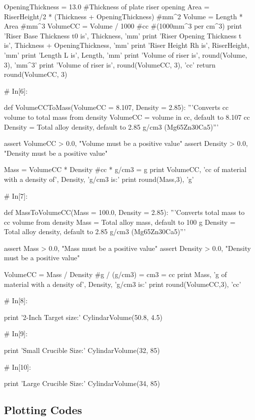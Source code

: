\documentclass[a4paper,8pt]{article}
\begin{document}
\begin{python}
OpeningThickness = 13.0 #Thickness of plate riser opening
Area = RiserHeight/2 * (Thickness + OpeningThickness) #mm^2
Volume = Length * Area #mm^3
VolumeCC = Volume / 1000 #cc #(1000mm^3 per cm^3)
print 'Riser Base Thickness t0 is', Thickness, 'mm'
print 'Riser Opening Thickness t is', Thickness + OpeningThickness, 'mm'
print 'Riser Height Rh is', RiserHeight, 'mm'
print 'Length L is', Length, 'mm'
print 'Volume of riser is', round(Volume, 3), 'mm^3'
print 'Volume of riser is', round(VolumeCC, 3), 'cc'
return round(VolumeCC, 3)


# In[6]:

def VolumeCCToMass(VolumeCC = 8.107, Density = 2.85):
'''Converts cc volume to total mass from density 
VolumeCC = volume in cc, default to 8.107 cc
Density = Total alloy density, default to 2.85 g/cm3 (Mg65Zn30Ca5)'''

assert VolumeCC > 0.0, "Volume must be a positive value"
assert Density > 0.0, "Density must be a positive value"

Mass = VolumeCC * Density #cc * g/cm3 = g
print VolumeCC, 'cc of material with a density of', Density, 'g/cm3 is:'
print round(Mass,3), 'g'


# In[7]:

def MassToVolumeCC(Mass = 100.0, Density = 2.85):
'''Converts total mass to cc volume from density 
Mass = Total alloy mass, default to 100 g
Density = Total alloy density, default to 2.85 g/cm3 (Mg65Zn30Ca5)'''

assert Mass > 0.0, "Mass must be a positive value"
assert Density > 0.0, "Density must be a positive value"

VolumeCC = Mass / Density #g / (g/cm3) = cm3 = cc
print Mass, 'g of material with a density of', Density, 'g/cm3 is:'
print round(VolumeCC,3), 'cc'


# In[8]:

print '2-Inch Target size:'
CylindarVolume(50.8, 4.5)


# In[9]:

print 'Small Crucible Size:'
CylindarVolume(32, 85)


# In[10]:

print 'Large Crucible Size:'
CylindarVolume(34, 85)

\end{python}

\newpage
\subsection{Plotting Codes}
\end{document}

